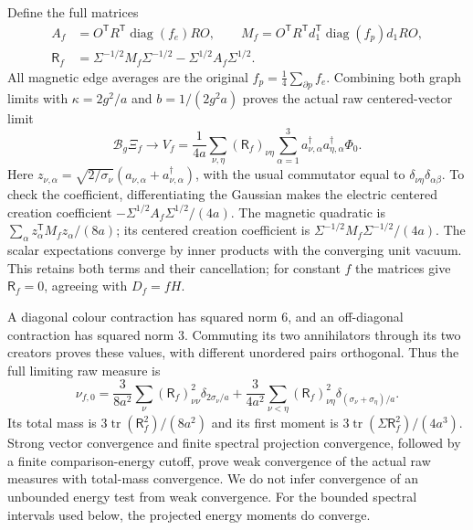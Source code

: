 \documentclass[11pt]{article}
\begin{document}
Define the full matrices
\begin{align}
 A_f&=O^{\mathsf T}R^{\mathsf T}\operatorname{diag}(f_e)RO,
 \qquad
 M_f=O^{\mathsf T}R^{\mathsf T}d_1^{\mathsf T}
                  \operatorname{diag}(f_p)d_1RO, \nonumber\\
 \mathsf R_f&=\Sigma^{-1/2}M_f\Sigma^{-1/2}
                   -\Sigma^{1/2}A_f\Sigma^{1/2}. \label{eq:low-pair}
\end{align}
All magnetic edge averages are the original $f_p=\frac14\sum_{\partial p}f_e$.
Combining both graph limits with $\kappa=2g^2/a$ and $b=1/(2g^2a)$
proves the actual raw centered-vector limit
\begin{equation}\label{eq:low-vector}
 \mathcal B_g\Xi_f\longrightarrow
 V_f=\frac1{4a}\sum_{\nu,\eta}(\mathsf R_f)_{\nu\eta}
       \sum_{\alpha=1}^3
       a_{\nu,\alpha}^\dagger a_{\eta,\alpha}^\dagger\Phi_0 .
\end{equation}
Here $z_{\nu,\alpha}=\sqrt{2/\sigma_\nu}
(a_{\nu,\alpha}+a_{\nu,\alpha}^\dagger)$, with the usual commutator
equal to $\delta_{\nu\eta}\delta_{\alpha\beta}$.
To check the coefficient, differentiating the Gaussian makes the
electric centered creation coefficient $-\Sigma^{1/2}A_f\Sigma^{1/2}/(4a)$.
The magnetic quadratic is $\sum_\alpha z_\alpha^{\mathsf T}M_fz_\alpha/(8a)$;
its centered creation coefficient is
$\Sigma^{-1/2}M_f\Sigma^{-1/2}/(4a)$.
The scalar expectations converge by inner products with the converging
unit vacuum. This retains both terms and their cancellation; for constant
$f$ the matrices give $\mathsf R_f=0$, agreeing with $D_f=fH$.

A diagonal colour contraction has squared norm $6$, and an
off-diagonal contraction has squared norm $3$. Commuting its two
annihilators through its two creators proves these values, with
different unordered pairs orthogonal. Thus the full limiting raw measure is
\begin{equation}\label{eq:low-full-measure}
 \nu_{f,0}=\frac3{8a^2}\sum_\nu(\mathsf R_f)_{\nu\nu}^2
                       \delta_{2\sigma_\nu/a}
 +\frac3{4a^2}\sum_{\nu<\eta}(\mathsf R_f)_{\nu\eta}^2
                       \delta_{(\sigma_\nu+\sigma_\eta)/a}.
\end{equation}
Its total mass is $3\operatorname{tr}(\mathsf R_f^2)/(8a^2)$ and its
first moment is $3\operatorname{tr}(\Sigma\mathsf R_f^2)/(4a^3)$.
Strong vector convergence and finite spectral projection convergence,
followed by a finite comparison-energy cutoff, prove weak convergence
of the actual raw measures with total-mass convergence. We do not
infer convergence of an unbounded energy test from weak convergence.
For the bounded spectral intervals used below, the projected
energy moments do converge.
\end{document}

